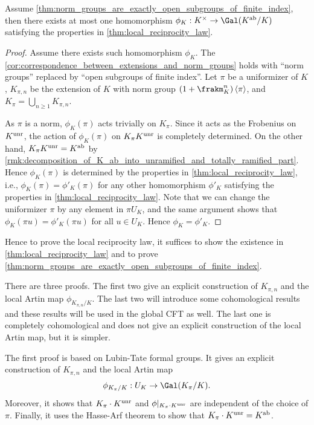   \begin{theorem}\label{thm:uniqueness_of_local_reciprocity_map}
    Assume \cref{thm:norm_groups_are_exactly_open_subgroups_of_finite_index}, then there exists at most one homomorphism $\phi_K: K^\times \to \Gal(K^\ab/K)$ satisfying the properties in \cref{thm:local_reciprocity_law}.
  \end{theorem}
  \begin{proof}
    Assume there exists such homomorphism $\phi_K$.
    The \cref{cor:correspondence_between_extensions_and_norm_groups} holds with ``norm groups'' replaced by ``open subgroups of finite index''.
    Let $\pi$ be a uniformizer of $K$, $K_{\pi,n}$ be the extension of $K$ with norm group $(1+\frakm_K^n)\left<\pi\right>$, and $K_\pi = \bigcup_{n \geq 1} K_{\pi,n}$.

    As $\pi$ is a norm, $\phi_K(\pi)$ acts trivially on $K_\pi$.
    Since it acts as the Frobenius on $K^{\mathrm{unr}}$, the action of $\phi_K(\pi)$ on $K_\pi K^{\mathrm{unr}}$ is completely determined.
    On the other hand, $K_\pi K^{\mathrm{unr}} = K^{\text{ab}}$ by \cref{rmk:decomposition_of_K_ab_into_unramified_and_totally_ramified_part}.
    Hence $\phi_K(\pi)$ is determined by the properties in \cref{thm:local_reciprocity_law}, 
    i.e., $\phi_K(\pi) = \phi'_K(\pi)$ for any other homomorphism $\phi'_K$ satisfying the properties in \cref{thm:local_reciprocity_law}.
    Note that we can change the uniformizer $\pi$ by any element in $\pi U_K$, and the same argument shows that $\phi_K(\pi u) = \phi'_K(\pi u)$ for all $u \in U_K$.
    Hence $\phi_K = \phi'_K$.
  \end{proof}

  Hence to prove the local reciprocity law, it suffices to show the existence in \cref{thm:local_reciprocity_law} and to prove \cref{thm:norm_groups_are_exactly_open_subgroups_of_finite_index}.

  There are three proofs.
  The first two give an explicit construction of $K_{\pi,n}$ and the local Artin map $\phi_{K_{\pi,n}/K}$.
  The last two will introduce some cohomological results and these results will be used in the global CFT as well.
  The last one is completely cohomological and does not give an explicit construction of the local Artin map, but it is simpler.

  The first proof is based on Lubin-Tate formal groups. It gives an explicit construction of $K_{\pi,n}$ and the local Artin map 
  \[ \phi_{K_{\pi}/K}: U_K \to \Gal(K_\pi/K). \]
  Moreover, it shows that $K_\pi \cdot K^{\mathrm{unr}}$ and $\phi|_{K_\pi \cdot K^{\mathrm{unr}}}$ are independent of the choice of $\pi$.
  Finally, it uses the Hasse-Arf theorem to show that $K_\pi \cdot K^{\mathrm{unr}} = K^{\text{ab}}$.